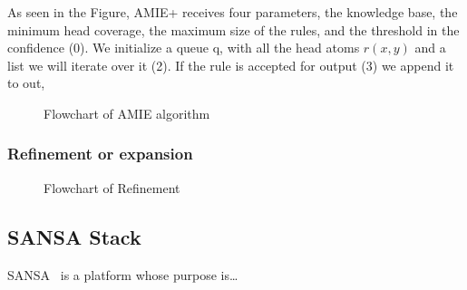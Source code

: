 \documentclass{article}
\begin{document}
As seen in the Figure,  AMIE+ receives four parameters, the knowledge base, the
minimum head coverage, the maximum size of the rules, and the threshold in the
confidence (0). We initialize a queue q, with all the head atoms $r(x,y)$ and a
list we will iterate over it (2). If the rule is accepted for
output (3) we append it to out, 

\begin{figure}[htbp]
\resizebox{!}{18cm}{%
    
}
\caption{Flowchart of AMIE algorithm}
\label{fig:amie_flowchart}
\end{figure}

\subsubsection{Refinement or expansion}

\begin{figure}[htbp]
\resizebox{!}{18cm}{%
    
}
\caption{Flowchart of Refinement}
\label{fig:refinement}
\end{figure}


\subsection{SANSA Stack}

SANSA~\cite{lehmann-2017-sansa-iswc} is a platform whose purpose is\ldots



\end{document}
